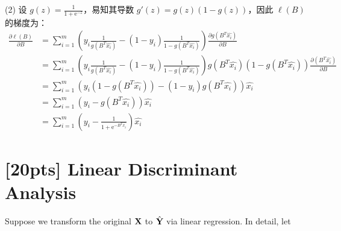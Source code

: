 \documentclass{article}
\begin{document}
    (2) 设 $g(z) = \frac{1}{1+\mathrm{e}^{-z}}$，易知其导数 $g'(z) = g(z)\left(1-g(z)\right)$，因此 $\ell(B)$ 的梯度为：\\
        \begin{equation}
        \begin{aligned}
        \frac{\partial\ell(B)}{\partial B}
        &= \sum_{i=1}^{m} \left(y_i\frac{1}{g(B^T\hat{x_i})}-(1-y_i)\frac{1}{1-g(B^T\hat{x_i})}\right) \frac{\partial g(B^T\hat{x_i})}{\partial B} \\
        &= \sum_{i=1}^{m} \left(y_i\frac{1}{g(B^T\hat{x_i})}-(1-y_i)\frac{1}{1-g(B^T\hat{x_i})}\right) g(B^T\hat{x_i}) (1-g(B^T\hat{x_i})) \frac{\partial(B^T\hat{x_i})}{\partial B} \\
        &= \sum_{i=1}^{m} \left(y_i(1-g(B^T\hat{x_i}))-(1-y_i)g(B^T\hat{x_i})\right) \hat{x_i} \\
        &= \sum_{i=1}^{m} \left(y_i-g(B^T\hat{x_i})\right) \hat{x_i} \\
        &= \sum_{i=1}^{m} \left(y_i-\frac{1}{1+\mathrm{e}^{-B^T\hat{x_i}}}\right) \hat{x_i}
        \end{aligned}
        \end{equation}


\vspace{3cm}


	\section{[20pts] Linear Discriminant Analysis}
	
	\noindent Suppose we transform the original $\bf X$ to $\hat{\bf Y}$ via linear regression. In detail, let 
	
\end{document}
